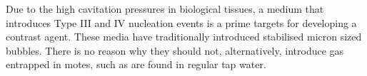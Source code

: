 Due to the high cavitation pressures in biological tissues,
a medium that introduces Type III and IV nucleation events is a prime targets for developing a contrast agent.
These media have traditionally introduced stabilised micron sized bubbles.
There is no reason why they should not, alternatively, introduce gas entrapped in motes,
such as are found in regular tap water.







